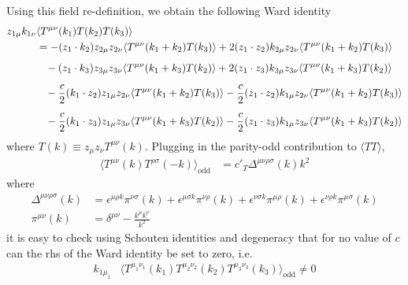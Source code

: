 \documentclass[a4paper,11pt]{article}
\begin{document}
%
Using this field re-definition, we obtain the following Ward identity \cite{Baumann:2020dch}
\begin{align}
\begin{split}
z_{1\mu}k_{1\nu}&\langle T^{\mu\nu}(k_1) T(k_2) T(k_3) \rangle \\
&= -(z_1 \cdot k_2) z_{2\mu}z_{2\nu}\langle T^{\mu\nu}(k_1 + k_2) T(k_3) \rangle +2(z_1 \cdot z_2)k_{2\mu}z_{2\nu}\langle T^{\mu\nu}(k_1+k_2) T(k_3) \rangle\\[5 pt]
&\hspace{.3cm}-(z_1 \cdot k_3)z_{3\mu} z_{3\nu}\langle  T^{\mu\nu}(k_1+k_3) T(k_2) \rangle + 2(z_1 \cdot z_3)k_{3\mu}z_{3\nu}\langle T^{\mu\nu}(k_1+k_3) T(k_2) \rangle\\[5 pt]
&\hspace{.3cm}-\frac{c}{2}(k_1 \cdot z_2)z_{1\mu}z_{2\nu}\langle T^{\mu\nu}(k_1+k_2) T(k_3) \rangle-\frac{c}{2}(z_1 \cdot z_2)k_{1\mu}z_{2\nu}\langle T^{\mu\nu}(k_1+k_2) T(k_3) \rangle\\[5 pt]
&\hspace{.3cm}-\frac{c}{2}(k_1 \cdot z_3)z_{1\mu}z_{3\nu}\langle T^{\mu\nu}(k_1+k_3) T(k_2) \rangle-\frac{c}{2}(z_1 \cdot z_3)k_{1\mu}z_{3\nu}\langle T^{\mu\nu}(k_1+k_3) T(k_2) \rangle
\end{split}
\end{align}
where $T(k)\equiv z_{\mu}z_{\nu}T^{\mu\nu}(k)$.
Plugging in the parity-odd contribution to $\langle TT\rangle$,
\begin{align}\label{abcs}
    \langle T^{\mu\nu}(k)T^{\rho\sigma}(-k) \rangle_{\text{odd}} &= c'_{T} \Delta^{\mu\nu\rho\sigma}(k)k^2
    \end{align}
    where 
\begin{align}
    \Delta^{\mu\nu\rho\sigma}(k) &=\epsilon^{\mu \rho k} \pi^{\nu \sigma}(k)+\epsilon^{\mu \sigma k} \pi^{\nu \rho}(k)+\epsilon^{\nu \sigma k} \pi^{\mu \rho}(k)+\epsilon^{\nu \rho k} \pi^{\mu \sigma}(k)\\[5 pt]
    \pi^{\mu\nu}(k) &= \delta^{\mu\nu}-\frac{k^{\mu}k^{\nu}}{k^2}
\end{align}
it is easy to check using Schouten identities and degeneracy that for no value of $c$ can the rhs of the Ward identity be set to zero, i.e. 
\begin{align}
k_{1\mu_1}&\langle T^{\mu_1\nu_1}(k_1) T^{\mu_2\nu_2}(k_2) T^{\mu_3\nu_3}(k_3) \rangle_{\text{odd}}\ne 0
\end{align}
\end{document}
